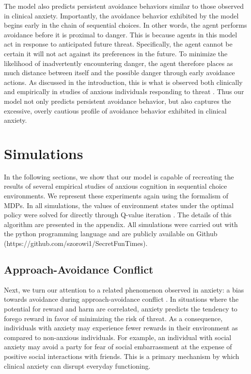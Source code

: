 \documentclass[11pt]{article} %
\begin{document}
The model also predicts persistent avoidance behaviors similar to those observed in clinical anxiety. Importantly, the avoidance behavior exhibited by the model begins early in the chain of sequential choices. In other words, the agent performs avoidance before it is proximal to danger. This is because agents in this model act in response to anticipated future threat. Specifically, the agent cannot be certain it will not act against its preferences in the future. To minimize the likelihood of inadvertently encountering danger, the agent therefore places as much distance between itself and the possible danger through early avoidance actions. As discussed in the introduction, this is what is observed both clinically and empirically in studies of anxious individuals responding to threat \citep{Bach2014, Bach2017, Sheynin2014}. Thus our model not only predicts persistent avoidance behavior, but also captures the excessive, overly cautious profile of avoidance behavior exhibited in clinical anxiety.

\section{Simulations}

In the following sections, we show that our model is capable of recreating the results of several empirical studies of anxious cognition in sequential choice environments. We represent these experiments again using the formalism of MDPs. In all simulations, the values of environment states under the optimal policy were solved for directly through Q-value iteration \citep{SuttonBarto1998, SuttonBarto1998, bertsekas2005}. The details of this algorithm are presented in the appendix. All simulations were carried out with the python programming language and are publicly available on Github (https://github.com/szorowi1/SecretFunTimes).

\subsection{Approach-Avoidance Conflict}

Next, we turn our attention to a related phenomenon observed in anxiety: a bias towards avoidance during approach-avoidance conflict \citep{aupperle2010}. In situations where the potential for reward and harm are correlated,
anxiety predicts the tendency to forego reward in favor of minimizing the risk of threat. As a consequence, individuals with anxiety may experience fewer rewards in their environment as compared to non-anxious individuals. For example, an individual with social anxiety may avoid a party for fear of social embarrassment at the expense of positive social interactions with friends. This is a primary mechanism by which clinical anxiety can disrupt everyday functioning.
\end{document}
